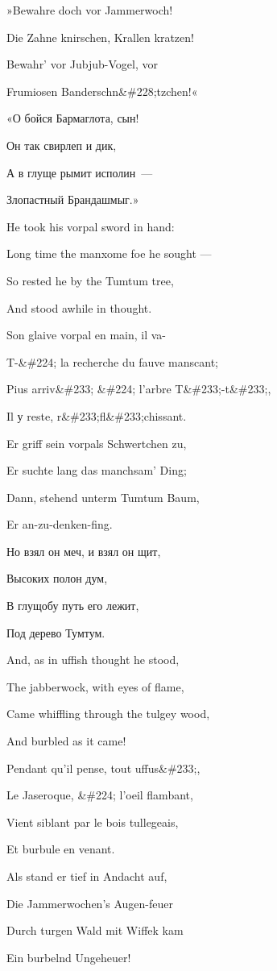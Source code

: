 \documentclass[../main.tex]{subfiles}
\begin{document}
»Bewahre doch vor Jammerwoch!

Die Zahne knirschen, Krallen kratzen!

Bewahr' vor Jubjub-Vogel, vor

Frumiosen Banderschn\&\#228;tzchen!«

«О бойся Бармаглота, сын!

Он так свирлеп и дик,

А в глуще рымит исполин~---

Злопастный Брандашмыг.»

He took his vorpal sword in hand:

Long time the manxome foe he sought ---

So rested he by the Tumtum tree,

And stood awhile in thought.

Son glaive vorpal en main, il va-

T-\&\#224; la recherche du fauve manscant;

Pius arriv\&\#233; \&\#224; l'arbre T\&\#233;-t\&\#233;,

Il у reste, r\&\#233;fl\&\#233;chissant.

Er griff sein vorpals Schwertchen zu,

Er suchte lang das manchsam' Ding;

Dann, stehend unterm Tumtum Baum,

Er an-zu-denken-fing.

Но взял он меч, и взял он щит,

Высоких полон дум,

В глущобу путь его лежит,

Под дерево Тумтум.

And, as in uffish thought he stood,

The jabberwock, with eyes of flame,

Came whiffling through the tulgey wood,

And burbled as it came!

Pendant qu'il pense, tout uffus\&\#233;,

Le Jaseroque, \&\#224; l'oeil flambant,

Vient siblant par le bois tullegeais,

Et burbule en venant.

Als stand er tief in Andacht auf,

Die Jammerwochen's Augen-feuer

Durch turgen Wald mit Wiffek kam

Ein burbelnd Ungeheuer!
\end{document}
